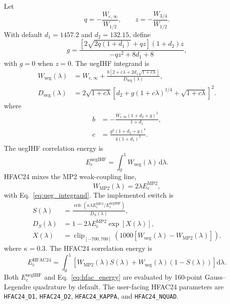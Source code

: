 \documentclass[aip,jcp,reprint,superscriptaddress]{revtex4-2}
\newcommand{\keyword}[1]{\texttt{#1}}
\newcommand{\dd}{\mathrm{d}}
\newcommand{\EMPtwo}{E_{\mathrm{c}}^{\mathrm{MP2}}}
\newcommand{\Wcinf}{W_{\mathrm{c},\infty}}
\newcommand{\Whalf}{W_{1/2}}
\newcommand{\Wthreeq}{W_{3/4}}
\begin{document}
Let
\begin{equation}
  q=-\frac{\Wcinf}{\Whalf},\qquad
  z=-\frac{\Wthreeq}{\Whalf}.
\end{equation}
With default \(d_1=1457.2\) and \(d_2=132.15\), define
\begin{equation}
  g=
  \frac{\left[2\sqrt{2q(1+d_1)}+qz\right](1+d_2)z}
       {-qz^2+8d_1+8},
\end{equation}
with \(g=0\) when \(z=0\).  The uegIHF integrand is
\begin{equation}
  \begin{aligned}
  W_{\mathrm{ueg}}(\lambda)
  &=
  \Wcinf+
  \frac{b\left[2+c\lambda+2d_1\sqrt{1+c\lambda}\right]}
       {D_{\mathrm{ueg}}(\lambda)},\\
  D_{\mathrm{ueg}}(\lambda)
  &=
  2\sqrt{1+c\lambda}
  \left[d_2+g(1+c\lambda)^{1/4}+\sqrt{1+c\lambda}\right]^2 .
  \end{aligned}
  \label{eq:ueg_integrand}
\end{equation}
where
\begin{align}
  b &= -\frac{\Wcinf(1+d_2+g)^2}{1+d_1},\\
  c &= \frac{q^2(1+d_2+g)^4}{4(1+d_1)^2}.
\end{align}
The uegIHF correlation energy is
\begin{equation}
  E_{\mathrm{c}}^{\mathrm{uegIHF}}
  =
  \int_0^1 W_{\mathrm{ueg}}(\lambda)\,\dd\lambda .
\end{equation}
HFAC24 mixes the MP2 weak-coupling line,
\begin{equation}
  W_{\mathrm{MP2}}(\lambda)=2\lambda\EMPtwo,
\end{equation}
with Eq.~\eqref{eq:ueg_integrand}.  The implemented switch is
\begin{equation}
  \begin{aligned}
  S(\lambda)
  &=
  \frac{
    \operatorname{erfc}
    \left(\kappa\lambda\EMPtwo/E_{\mathrm{c}}^{\mathrm{uegIHF}}\right)
  }
  {D_S(\lambda)},\\
  D_S(\lambda)
  &=
  1-2\lambda\EMPtwo\exp[X(\lambda)],\\
  X(\lambda)
  &=
  \operatorname{clip}_{[-700,700]}
  \left(1000[W_{\mathrm{ueg}}(\lambda)-W_{\mathrm{MP2}}(\lambda)]\right).
  \end{aligned}
  \label{eq:hfac_switch}
\end{equation}
where \(\kappa=0.3\).  The HFAC24 correlation energy is
\begin{equation}
  E_{\mathrm{c}}^{\mathrm{HFAC24}}
  =
  \int_0^1
  \left[
    W_{\mathrm{MP2}}(\lambda)S(\lambda)
    +
    W_{\mathrm{ueg}}(\lambda)(1-S(\lambda))
  \right]\dd\lambda .
  \label{eq:hfac_energy}
\end{equation}
Both \(E_{\mathrm{c}}^{\mathrm{uegIHF}}\) and Eq.~\eqref{eq:hfac_energy} are evaluated by 160-point Gauss--Legendre quadrature by default.  The user-facing HFAC24 parameters are \keyword{HFAC24\_D1}, \keyword{HFAC24\_D2}, \keyword{HFAC24\_KAPPA}, and \keyword{HFAC24\_NQUAD}.
\end{document}
